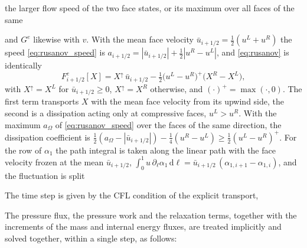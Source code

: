 {%
the larger flow speed of the two face states, or its maximum over all faces of the same

and $G^e$ likewise with $v$. With the mean face velocity $\bar u_{i+1/2}=\tfrac12(u^L+u^R)$ the speed \eqref{eq:rusanov_speed} is
$a_{i+1/2}=|\bar u_{i+1/2}|+\tfrac12|u^R-u^L|$, and \eqref{eq:rusanov} is identically
\begin{equation}
F^e_{i+1/2}[X]=X^{\uparrow}\,\bar u_{i+1/2}-\tfrac12\big(u^L-u^R\big)^+\big(X^R-X^L\big),
\label{eq:rusanov_upwind}
\end{equation}
with $X^\uparrow=X^L$ for $\bar u_{i+1/2}\ge0$, $X^\uparrow=X^R$ otherwise, and $(\cdot)^+=\max(\cdot,0)$. The first term transports $X$ with the mean face velocity
from its upwind side, the second is a dissipation acting only at compressive faces, $u^L>u^R$. With the maximum $a_\Omega$ of
\eqref{eq:rusanov_speed} over the faces of the same direction, the dissipation coefficient is
$\tfrac12(a_\Omega-|\bar u_{i+1/2}|)-\tfrac14(u^R-u^L)\ge\tfrac12(u^L-u^R)^+$.
For the row of $\alpha_1$ the path integral is taken along the linear path with the face velocity frozen at the mean
$\bar u_{i+1/2}$, $\int_0^1u\,\partial_\ell\alpha_1\,\mathrm d\ell=\bar u_{i+1/2}\,(\alpha_{1,i+1}-\alpha_{1,i})$, and the fluctuation is split

The time step is given by the CFL condition of the explicit transport,

The pressure flux, the pressure work and the relaxation terms, together with the increments of the mass and internal energy
fluxes, are treated implicitly and solved together, within a single step, as follows:

}
